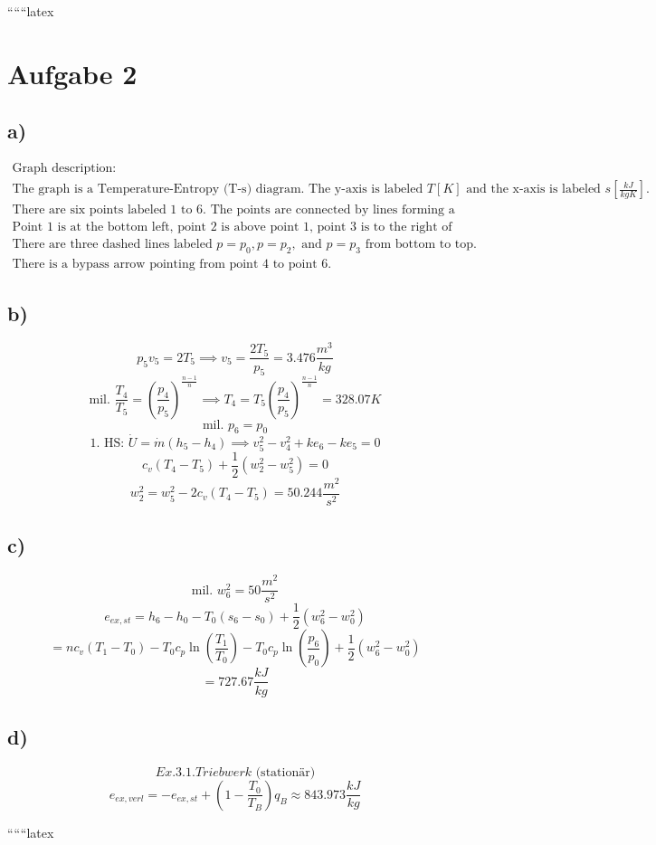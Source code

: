 
``````latex


\section*{Aufgabe 2}

\subsection*{a)}
\[
\begin{array}{l}
\text{Graph description:} \\
\text{The graph is a Temperature-Entropy (T-s) diagram. The y-axis is labeled } T[K] \text{ and the x-axis is labeled } s \left[ \frac{kJ}{kgK} \right]. \\
\text{There are six points labeled 1 to 6. The points are connected by lines forming a closed loop.} \\
\text{Point 1 is at the bottom left, point 2 is above point 1, point 3 is to the right of point 2, point 4 is below point 3, point 5 is to the left of point 4, and point 6 is to the left of point 5.} \\
\text{There are three dashed lines labeled } p = p_0, p = p_2, \text{ and } p = p_3 \text{ from bottom to top.} \\
\text{There is a bypass arrow pointing from point 4 to point 6.}
\end{array}
\]

\subsection*{b)}
\[
p_5 v_5 = 2 T_5 \implies v_5 = \frac{2 T_5}{p_5} = 3.476 \frac{m^3}{kg}
\]
\[
\text{mil. } \frac{T_4}{T_5} = \left( \frac{p_4}{p_5} \right)^{\frac{n-1}{n}} \implies T_4 = T_5 \left( \frac{p_4}{p_5} \right)^{\frac{n-1}{n}} = 328.07 K
\]
\[
\text{mil. } p_6 = p_0
\]
\[
1. \text{ HS: } \dot{U} = \dot{m} \left( h_5 - h_4 \right) \implies v_5^2 - v_4^2 + ke_6 - ke_5 = 0
\]
\[
c_v \left( T_4 - T_5 \right) + \frac{1}{2} \left( w_2^2 - w_5^2 \right) = 0
\]
\[
w_2^2 = w_5^2 - 2 c_v \left( T_4 - T_5 \right) = 50.244 \frac{m^2}{s^2}
\]

\subsection*{c)}
\[
\text{mil. } w_6^2 = 50 \frac{m^2}{s^2}
\]
\[
e_{ex,st} = h_6 - h_0 - T_0 \left( s_6 - s_0 \right) + \frac{1}{2} \left( w_6^2 - w_0^2 \right)
\]
\[
= n c_v \left( T_1 - T_0 \right) - T_0 c_p \ln \left( \frac{T_1}{T_0} \right) - T_0 c_p \ln \left( \frac{p_6}{p_0} \right) + \frac{1}{2} \left( w_6^2 - w_0^2 \right)
\]
\[
= 727.67 \frac{kJ}{kg}
\]

\subsection*{d)}
\[
Ex. 3.1. Triebwerk \text{ (stationär)}
\]
\[
e_{ex,verl} = -e_{ex,st} + \left( 1 - \frac{T_0}{T_B} \right) q_B \approx 843.973 \frac{kJ}{kg}
\]

``````latex


